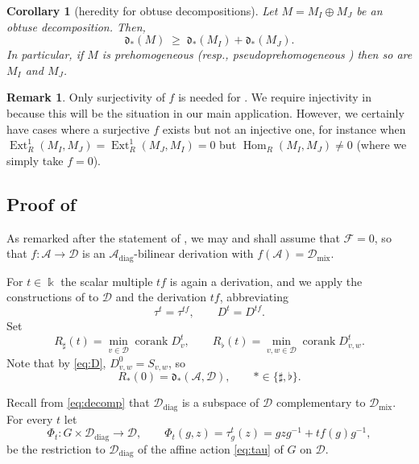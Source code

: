 \documentclass[12pt]{article}
\def\xspace{ }%
\newtheorem{corollary}[corollary]{Corollary}
\theoremstyle{definition}
\newtheorem{remark}[remark]{Remark}
\newcommand{\prigity}{pseudorigidity\xspace}
\newcommand{\obt}{obtuse\xspace}
\newcommand{\pvs}{prehomogeneous\xspace}
\newcommand{\wpvs}{pseudo\pvs}
\newcommand{\mix}{\mathrm{mix}}   %
\newcommand{\diag}{\mathrm{diag}} %
\newcommand{\Ext}{\operatorname{Ext}}
\newcommand{\Hom}{\operatorname{Hom}}
\newcommand{\kk}{\Bbbk}
\newcommand{\alg}{\mathcal{A}}   %
\newcommand{\bmdl}{\mathcal{D}}   %
\newcommand{\Ff}{\mathcal{F}}   %
\newcommand{\dfr}{\mathfrak{d}}  %
\newcommand{\Sop}{S}
\newcommand{\Dop}{D}
\newcommand{\rsub}{\sharp}       %
\newcommand{\psub}{\flat}        %
\newcommand{\cork}{\operatorname{corank}}
\begin{document}
\begin{corollary}[heredity for \obt decompositions]\label{cor:schema}
Let $M = M_I \oplus M_J$ be an \obt decomposition.
Then,
\[
  \dfr_\ast(M) \;\ge\; \dfr_\ast(M_I) + \dfr_\ast(M_J) .
\]
In particular, if $M$ is \pvs (resp., \wpvs) then so are $M_I$ and $M_J$.
\end{corollary}

\begin{remark}
Only surjectivity of $f$ is needed for .
We require injectivity in  because this will be the situation in our main application.
However, we certainly have cases where a surjective $f$ exists but not an injective one,
for instance when $\Ext^1_R(M_I,M_J)=\Ext^1_R(M_J,M_I)=0$ but $\Hom_R(M_I,M_J)\ne0$ (where we simply take $f=0$).
\end{remark}



\subsection{Proof of \texorpdfstring{}{Proposition}}\label{sec:proofoftwoblock}
As remarked after the statement of , we may and shall assume that $\Ff=0$, 
so that $f : \alg \to \bmdl$ is an $\alg_{\diag}$-bilinear derivation  with $f(\alg) =\bmdl_{\mix}$.

For $t \in \kk$ the scalar multiple $tf$ is again a
derivation, and we apply the constructions of  to $\bmdl$ and the derivation $tf$, abbreviating
\[
   \tau^t = \tau^{tf}, \qquad \Dop^t = \Dop^{tf} .
\]
Set
\[
   R_\rsub(t) = \min_{v \in \bmdl}\cork \Dop^t_v,
   \qquad
   R_\psub(t) = \min_{v,w\in \bmdl}\cork \Dop^t_{v,w} .
\]
Note that by \eqref{eq:D}, $\Dop^0_{v,w} = \Sop_{v,w}$, so
\begin{equation}\label{eq:step1}
   R_\ast(0) = \dfr_\ast(\alg,\bmdl), \qquad \ast \in \{\rsub,\psub\} .
\end{equation}


Recall from \eqref{eq:decomp} that $\bmdl_{\diag}$ is a subspace
of $\bmdl$ complementary to $\bmdl_{\mix}$. For every $t$ let
\begin{equation}\label{eq:Phi}
   \Phi_t : G\times\bmdl_{\diag} \longrightarrow \bmdl,
   \qquad
   \Phi_t(g,z) = \tau^t_g(z) = gzg^{-1} + tf(g)g^{-1},
\end{equation}
be the restriction to $\bmdl_{\diag}$ of the affine action
\eqref{eq:tau} of $G$ on $\bmdl$.
\end{document}

